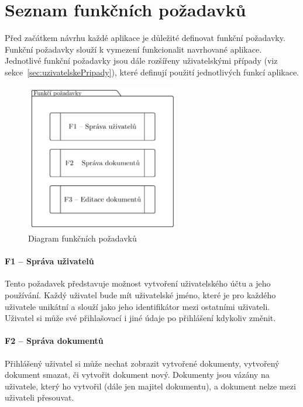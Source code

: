 
\section{Seznam funkčních požadavků}\label{sec:seznamFunkčníchPožadavků}

Před začátkem návrhu každé aplikace je důležité definovat funkční požadavky.
Funkční požadavky slouží k vymezení funkcionalit navrhované aplikace.
Jednotlivé funkční požadavky jsou dále rozšířeny uživatelskými případy (viz sekce~\ref{sec:uzivatelskePripady}), které definují použití jednotlivých funkcí aplikace.

\begin{figure}[ht!]
    \centering
    \includegraphics[width=0.6\textwidth]{partials/analyza/funkcniPozadavky.pdf}
    \caption{Diagram funkčních požadavků}\label{fig:funkciPozadavky}
\end{figure}

\paragraph{F1 -- Správa uživatelů}

Tento požadavek představuje možnost vytvoření uživatelského účtu a jeho používání.
Každý uživatel bude mít uživatelské jméno, které je pro každého uživatele unikátní a slouží jako jeho identifikátor mezi ostatními uživateli.
Uživatel si může své přihlašovací i jiné údaje po přihlášení kdykoliv změnit.

\paragraph{F2 -- Správa dokumentů}

Přihlášený uživatel si může nechat zobrazit vytvořené dokumenty, vytvořený dokument smazat, či vytvořit dokument nový.
Dokumenty jsou vázány na uživatele, který ho vytvořil (dále jen majitel dokumentu), a dokument nelze mezi uživateli přesouvat.

